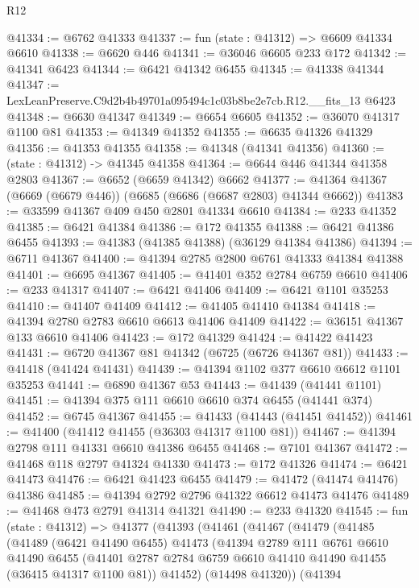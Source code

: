 \begin{lexlean}{R12}
\begin{coremodule}
@41334 := @6762 @41333
@41337 := fun (state : @41312) => @6609 @41334 @6610
@41338 := @6620 @446
@41341 := @36046 @6605 @233 @172
@41342 := @41341 @6423
@41344 := @6421 @41342 @6455
@41345 := @41338 @41344
@41347 := LexLeanPreserve.C9d2b4b49701a095494c1c03b8be2e7cb.R12.__fits_13 @6423
@41348 := @6630 @41347
@41349 := @6654 @6605
@41352 := @36070 @41317 @1100 @81
@41353 := @41349 @41352
@41355 := @6635 @41326 @41329
@41356 := @41353 @41355
@41358 := @41348 (@41341 @41356)
@41360 := (state : @41312) -> @41345 @41358
@41364 := @6644 @446 @41344 @41358 @2803
@41367 := @6652 (@6659 @41342) @6662
@41377 := @41364 @41367 (@6669 (@6679 @446)) (@6685 (@6686 (@6687 @2803) @41344 @6662))
@41383 := @33599 @41367 @409 @450 @2801 @41334 @6610
@41384 := @233 @41352
@41385 := @6421 @41384
@41386 := @172 @41355
@41388 := @6421 @41386 @6455
@41393 := @41383 (@41385 @41388) (@36129 @41384 @41386)
@41394 := @6711 @41367
@41400 := @41394 @2785 @2800 @6761 @41333 @41384 @41388
@41401 := @6695 @41367
@41405 := @41401 @352 @2784 @6759 @6610
@41406 := @233 @41317
@41407 := @6421 @41406
@41409 := @6421 @1101 @35253
@41410 := @41407 @41409
@41412 := @41405 @41410 @41384
@41418 := @41394 @2780 @2783 @6610 @6613 @41406 @41409
@41422 := @36151 @41367 @133 @6610 @41406
@41423 := @172 @41329
@41424 := @41422 @41423
@41431 := @6720 @41367 @81 @41342 (@6725 (@6726 @41367 @81))
@41433 := @41418 (@41424 @41431)
@41439 := @41394 @1102 @377 @6610 @6612 @1101 @35253
@41441 := @6890 @41367 @53
@41443 := @41439 (@41441 @1101)
@41451 := @41394 @375 @111 @6610 @6610 @374 @6455 (@41441 @374)
@41452 := @6745 @41367
@41455 := @41433 (@41443 (@41451 @41452))
@41461 := @41400 (@41412 @41455 (@36303 @41317 @1100 @81))
@41467 := @41394 @2798 @111 @41331 @6610 @41386 @6455
@41468 := @7101 @41367
@41472 := @41468 @118 @2797 @41324 @41330
@41473 := @172 @41326
@41474 := @6421 @41473
@41476 := @6421 @41423 @6455
@41479 := @41472 (@41474 @41476) @41386
@41485 := @41394 @2792 @2796 @41322 @6612 @41473 @41476
@41489 := @41468 @473 @2791 @41314 @41321
@41490 := @233 @41320
@41545 := fun (state : @41312) =>
  @41377
    (@41393
      (@41461
        (@41467
          (@41479
            (@41485
              (@41489
                (@6421 @41490 @6455)
                @41473
                (@41394
                  @2789
                  @111
                  @6761
                  @6610
                  @41490
                  @6455
                  (@41401 @2787 @2784 @6759 @6610 @41410 @41490 @41455 (@36415 @41317 @1100 @81))
                  @41452)
                (@14498 @41320))
              (@41394

\end{coremodule}
\end{lexlean}
